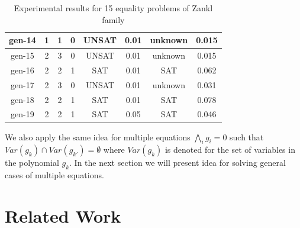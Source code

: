 \documentclass[runningheads,a4paper,oribibl]{llncs}
\begin{document}
{{\begin{table}
{\begin{tabular}[b]{|c|c|c|c|c|c|c|c|}
\hline
gen-14 & 1 & 1 & 0& UNSAT &0.01 & unknown &0.015\\
\hline
gen-15 & 2 & 3 & 0& UNSAT &0.01 & unknown &0.015\\
\hline
gen-16 & 2 & 2 & 1& SAT &0.01 & SAT &0.062\\
\hline
gen-17 & 2 & 3 & 0& UNSAT &0.01 & unknown &0.031\\
\hline
gen-18 & 2 & 2 & 1& SAT &0.01 & SAT &0.078\\
\hline
gen-19 & 2 & 2 & 1& SAT &0.05 & SAT &0.046\\
\hline
\end{tabular}
}
\caption{Experimental results for 15 equality problems of Zankl family}
\label{tab:eqexp}
\end{table}

We also apply the same idea for multiple equations $\bigwedge \limits_{i} g_i = 0$ such that $Var(g_k) \cap Var(g_{k'}) = \emptyset$ where $Var(g_k)$ is denoted for the set of variables in the polynomial $g_k$. In the next section we will present idea for solving general cases of multiple equations.
}

}

\section{Related Work} \label{sec:relate}
\end{document}
